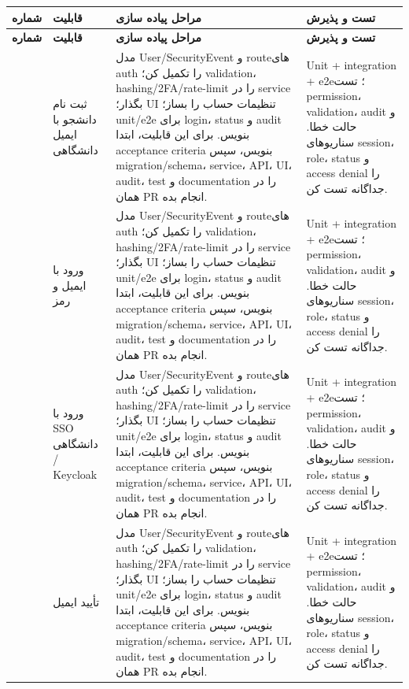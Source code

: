 \documentclass[11pt,a4paper]{article}
\begin{document}
\begin{longtable}{|>{\raggedleft\arraybackslash}p{}|>{\raggedleft\arraybackslash}p{}|>{\raggedleft\arraybackslash}p{}|>{\raggedleft\arraybackslash}p{}|}
\hline
\textbf{شماره} & \textbf{قابلیت} & \textbf{مراحل پیاده سازی} & \textbf{تست و پذیرش} \\\hline
\endfirsthead
\hline
\textbf{شماره} & \textbf{قابلیت} & \textbf{مراحل پیاده سازی} & \textbf{تست و پذیرش} \\\hline
\endhead
1 & ثبت نام دانشجو با ایمیل دانشگاهی & مدل User/SecurityEvent و routeهای auth را تکمیل کن؛ validation، hashing/2FA/rate-limit را در service بگذار؛ UI تنظیمات حساب را بساز؛ unit/e2e برای login، status و audit بنویس. برای این قابلیت، ابتدا acceptance criteria بنویس، سپس migration/schema، service، API، UI، audit، test و documentation را در همان PR انجام بده. & Unit + integration + e2e؛ تست permission، validation، audit و حالت خطا. سناریوهای session، role، status و access denial را جداگانه تست کن. \\ \hline
2 & ورود با ایمیل و رمز & مدل User/SecurityEvent و routeهای auth را تکمیل کن؛ validation، hashing/2FA/rate-limit را در service بگذار؛ UI تنظیمات حساب را بساز؛ unit/e2e برای login، status و audit بنویس. برای این قابلیت، ابتدا acceptance criteria بنویس، سپس migration/schema، service، API، UI، audit، test و documentation را در همان PR انجام بده. & Unit + integration + e2e؛ تست permission، validation، audit و حالت خطا. سناریوهای session، role، status و access denial را جداگانه تست کن. \\ \hline
3 & ورود با SSO دانشگاهی / Keycloak & مدل User/SecurityEvent و routeهای auth را تکمیل کن؛ validation، hashing/2FA/rate-limit را در service بگذار؛ UI تنظیمات حساب را بساز؛ unit/e2e برای login، status و audit بنویس. برای این قابلیت، ابتدا acceptance criteria بنویس، سپس migration/schema، service، API، UI، audit، test و documentation را در همان PR انجام بده. & Unit + integration + e2e؛ تست permission، validation، audit و حالت خطا. سناریوهای session، role، status و access denial را جداگانه تست کن. \\ \hline
4 & تأیید ایمیل & مدل User/SecurityEvent و routeهای auth را تکمیل کن؛ validation، hashing/2FA/rate-limit را در service بگذار؛ UI تنظیمات حساب را بساز؛ unit/e2e برای login، status و audit بنویس. برای این قابلیت، ابتدا acceptance criteria بنویس، سپس migration/schema، service، API، UI، audit، test و documentation را در همان PR انجام بده. & Unit + integration + e2e؛ تست permission، validation، audit و حالت خطا. سناریوهای session، role، status و access denial را جداگانه تست کن. \\ \hline

\end{longtable}
\end{document}
